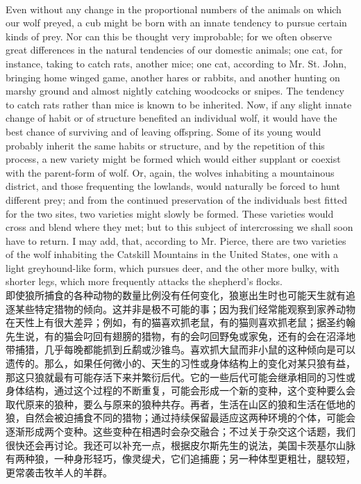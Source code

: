 \documentclass{article}
\begin{document}
\\
Even without any change in the proportional numbers of the animals on which our wolf preyed, a cub might be born with an innate tendency to pursue certain kinds of prey. Nor can this be thought very improbable; for we often observe great differences in the natural tendencies of our domestic animals; one cat, for instance, taking to catch rats, another mice; one cat, according to Mr. St. John, bringing home winged game, another hares or rabbits, and another hunting on marshy ground and almost nightly catching woodcocks or snipes. The tendency to catch rats rather than mice is known to be inherited. Now, if any slight innate change of habit or of structure benefited an individual wolf, it would have the best chance of surviving and of leaving offspring. Some of its young would probably inherit the same habits or structure, and by the repetition of this process, a new variety might be formed which would either supplant or coexist with the parent-form of wolf. Or, again, the wolves inhabiting a mountainous district, and those frequenting the lowlands, would naturally be forced to hunt different prey; and from the continued preservation of the individuals best fitted for the two sites, two varieties might slowly be formed. These varieties would cross and blend where they met; but to this subject of intercrossing we shall soon have to return. I may add, that, according to Mr. Pierce, there are two varieties of the wolf inhabiting the Catskill Mountains in the United States, one with a light greyhound-like form, which pursues deer, and the other more bulky, with shorter legs, which more frequently attacks the shepherd’s flocks.\\
即使狼所捕食的各种动物的数量比例没有任何变化，狼崽出生时也可能天生就有追逐某些特定猎物的倾向。这并非是极不可能的事；因为我们经常能观察到家养动物在天性上有很大差异；例如，有的猫喜欢抓老鼠，有的猫则喜欢抓老鼠；据圣约翰先生说，有的猫会叼回有翅膀的猎物，有的会叼回野兔或家兔，还有的会在沼泽地带捕猎，几乎每晚都能抓到丘鹬或沙锥鸟。喜欢抓大鼠而非小鼠的这种倾向是可以遗传的。那么，如果任何微小的、天生的习性或身体结构上的变化对某只狼有益，那这只狼就最有可能存活下来并繁衍后代。它的一些后代可能会继承相同的习性或身体结构，通过这个过程的不断重复，可能会形成一个新的变种，这个变种要么会取代原来的狼种，要么与原来的狼种共存。再者，生活在山区的狼和生活在低地的狼，自然会被迫捕食不同的猎物；通过持续保留最适应这两种环境的个体，可能会逐渐形成两个变种。这些变种在相遇时会杂交融合；不过关于杂交这个话题，我们很快还会再讨论。我还可以补充一点，根据皮尔斯先生的说法，美国卡茨基尔山脉有两种狼，一种身形轻巧，像灵缇犬，它们追捕鹿；另一种体型更粗壮，腿较短，更常袭击牧羊人的羊群。\\
\end{document}
